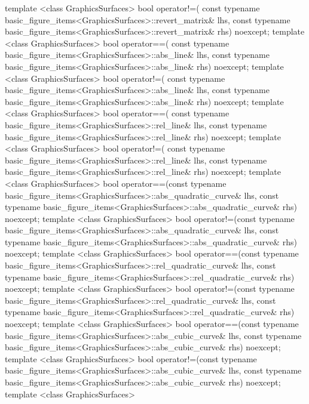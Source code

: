 \begin{codeblock}
{{{{    template <class GraphicsSurfaces>
    bool operator!=(
      const typename basic_figure_items<GraphicsSurfaces>::revert_matrix& lhs,
      const typename basic_figure_items<GraphicsSurfaces>::revert_matrix& rhs) 
      noexcept;
    template <class GraphicsSurfaces>
    bool operator==(
      const typename basic_figure_items<GraphicsSurfaces>::abs_line& lhs,
      const typename basic_figure_items<GraphicsSurfaces>::abs_line& rhs) 
      noexcept;
    template <class GraphicsSurfaces>
    bool operator!=(
      const typename basic_figure_items<GraphicsSurfaces>::abs_line& lhs,
      const typename basic_figure_items<GraphicsSurfaces>::abs_line& rhs) 
      noexcept;
    template <class GraphicsSurfaces>
    bool operator==(
      const typename basic_figure_items<GraphicsSurfaces>::rel_line& lhs,
      const typename basic_figure_items<GraphicsSurfaces>::rel_line& rhs) 
      noexcept;
    template <class GraphicsSurfaces>
    bool operator!=(
      const typename basic_figure_items<GraphicsSurfaces>::rel_line& lhs,
      const typename basic_figure_items<GraphicsSurfaces>::rel_line& rhs) 
      noexcept;
    template <class GraphicsSurfaces>
    bool operator==(const typename
      basic_figure_items<GraphicsSurfaces>::abs_quadratic_curve& lhs,
      const typename basic_figure_items<GraphicsSurfaces>::abs_quadratic_curve& 
      rhs) noexcept;
    template <class GraphicsSurfaces>
    bool operator!=(const typename 
      basic_figure_items<GraphicsSurfaces>::abs_quadratic_curve& lhs,
      const typename basic_figure_items<GraphicsSurfaces>::abs_quadratic_curve& 
      rhs) noexcept;
    template <class GraphicsSurfaces>
    bool operator==(const typename 
      basic_figure_items<GraphicsSurfaces>::rel_quadratic_curve& lhs,
      const typename basic_figure_items<GraphicsSurfaces>::rel_quadratic_curve& 
      rhs) noexcept;
    template <class GraphicsSurfaces>
    bool operator!=(const typename 
      basic_figure_items<GraphicsSurfaces>::rel_quadratic_curve& lhs,
      const typename basic_figure_items<GraphicsSurfaces>::rel_quadratic_curve& 
      rhs) noexcept;
    template <class GraphicsSurfaces>
    bool operator==(const typename 
      basic_figure_items<GraphicsSurfaces>::abs_cubic_curve& lhs,
      const typename basic_figure_items<GraphicsSurfaces>::abs_cubic_curve& 
      rhs) noexcept;
    template <class GraphicsSurfaces>
    bool operator!=(const typename 
      basic_figure_items<GraphicsSurfaces>::abs_cubic_curve& lhs,
      const typename basic_figure_items<GraphicsSurfaces>::abs_cubic_curve& 
      rhs) noexcept;
    template <class GraphicsSurfaces>
}}}}
\end{codeblock}
